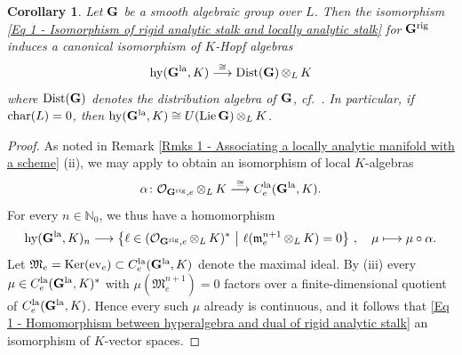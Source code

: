 \documentclass[a4paper, reqno, 10pt]{amsart}
\newtheorem{corollary}[theorem]{Corollary}
\theoremstyle{definition}
\numberwithin{equation}{section}
\newcommand{\botimes}[1]{{\,\otimes_{#1}\,}}
\newcommand{\ev}{{\mathrm{ev}}}
\newcommand{\hy}{{\mathrm{hy}}}
\newcommand{\Ker}{{\mathrm{Ker}}}
\newcommand{\la}{{\mathrm{la}}}
\newcommand{\lra}{\longrightarrow}
\newcommand{\lto}{\longmapsto}
\newcommand{\rig}{{\mathrm{rig}}}
\let\originalmiddle\middle
\renewcommand{\middle}[1]{\,\originalmiddle#1\,}
\newcommand{\BN}{{\mathbb {N}}}
\newcommand{\CO}{{\mathcal {O}}}
\newcommand{\bG}{{\mathrm{\bf G}}}
\newcommand{\Fm}{{\mathfrak {m}}}
\newcommand{\FM}{{\mathfrak {M}}}
\begin{document}
\begin{corollary}\label{Cor 1 - Hyperalgebra agrees with algebraic distribution algebra}
	Let $\bG$ be a smooth algebraic group over $L$.
	Then the isomorphism \eqref{Eq 1 - Isomorphism of rigid analytic stalk and locally analytic stalk} for $\bG^\rig$ induces a canonical isomorphism of $K$-Hopf algebras
	\begin{equation*}
		\hy(\bG^\la,K) \overset{\cong}{\lra} {\rm Dist}(\bG) \botimes{L} K 
	\end{equation*}
	where ${\rm Dist}(\bG)$ denotes the distribution algebra of $\bG$, cf.\ \cite[I.\ \S 7.7]{Jantzen03RepAlgGrp}.
	In particular, if ${\rm char}(L) =0$, then $\hy(\bG^\la,K) \cong U({\rm Lie}\,\bG) \botimes{L} K$.
\end{corollary}
\begin{proof}
	As noted in Remark \ref{Rmks 1 - Associating a locally analytic manifold with a scheme} (ii), we may apply  to obtain an isomorphism of local $K$-algebras
	\begin{equation*}
		\alpha \colon \CO_{\bG^\rig, e} \botimes{L} K \overset{\cong}{\lra} C^\la_e (\bG^\la, K) .
	\end{equation*}
	For every $n\in \BN_0$, we thus have a homomorphism
	\begin{equation}\label{Eq 1 - Homomorphism between hyperalgebra and dual of rigid analytic stalk}
		\hy(\bG^\la,K)_n \lra \left\{ \ell \in (\CO_{\bG^\rig, e} \botimes{L}K )^\ast \middle{|} \ell( \Fm_e^{n+1} \botimes{L} K) = 0 \right\} \,,\quad \mu \lto \mu \circ \alpha .
	\end{equation}
	Let $\FM_e = \Ker(\ev_e)\subset C^\la_e(\bG^\la,K)$ denote the maximal ideal.
	By  (iii) every $\mu \in C^\la_e(\bG^\la,K)^\ast$ with $\mu (\FM_e^{n+1}) =0$ factors over a finite-dimensional quotient of $C^\la_e(\bG^\la,K)$. 
	Hence every such $\mu$ already is continuous, and it follows that \eqref{Eq 1 - Homomorphism between hyperalgebra and dual of rigid analytic stalk} an isomorphism of $K$-vector spaces.
	


\end{proof}
\end{document}
